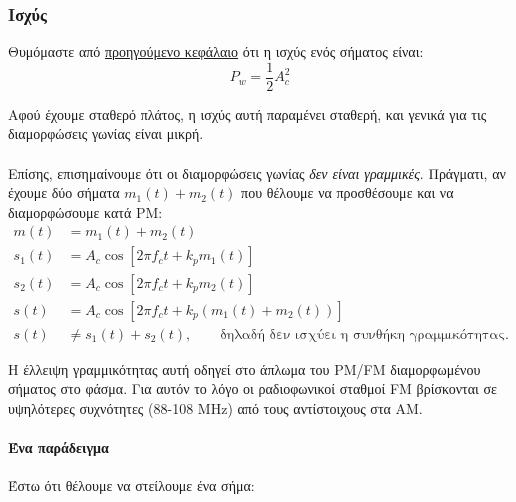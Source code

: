 \documentclass[11pt,a4paper,notitlepage,fleqn,final]{article}
\begin{document}
\subsubsection{Ισχύς}
Θυμόμαστε από \hyperref[am.power]{προηγούμενο κεφάλαιο} ότι η ισχύς ενός σήματος είναι:
\[
P_w = \frac{1}{2}A_c^2
\]

Αφού έχουμε σταθερό πλάτος, η ισχύς αυτή παραμένει σταθερή, και γενικά για τις διαμορφώσεις
γωνίας είναι μικρή.

\paragraph{}
Επίσης, επισημαίνουμε ότι οι διαμορφώσεις γωνίας \textit{δεν είναι γραμμικές}.
Πράγματι, αν έχουμε δύο σήματα \( m_1(t) + m_2(t) \) που θέλουμε να προσθέσουμε και
να διαμορφώσουμε κατά PM:
\begin{align*}
	m(t) &= m_1(t) + m_2(t) \\
	s_1(t) &= A_c\cos \left[ 2πf_c t + k_p m_1(t) \right] \\
	s_2(t) &= A_c\cos \left[ 2πf_c t + k_p m_2(t) \right] \\
	s(t) &= A_c\cos \left[ 2πf_c t + k_p \left( m_1(t)+m_2(t)\right)\right] \\
	s(t) &\neq s_1(t) + s_2(t), \qquad \text{δηλαδή δεν ισχύει η συνθήκη γραμμικότητας.}
\end{align*}

Η έλλειψη γραμμικότητας αυτή οδηγεί στο άπλωμα του PM/FM διαμορφωμένου σήματος στο φάσμα.
Για αυτόν το λόγο οι ραδιοφωνικοί σταθμοί FM βρίσκονται σε υψηλότερες συχνότητες
(88-108 MHz) από τους αντίστοιχους στα AM.

\paragraph{Ένα παράδειγμα}
Έστω ότι θέλουμε να στείλουμε ένα σήμα:

\end{document}
